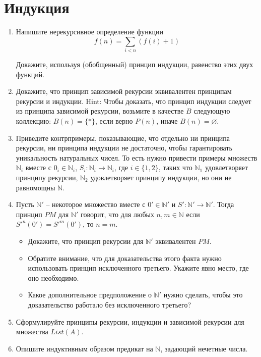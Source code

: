 \section*{Индукция}
\begin{enumerate}

\item Напишите нерекурсивное определение функции
\[ f(n) = \sum_{i < n} (f(i) + 1) \]

Докажите, используя (обобщенный) принцип индукции, равенство этих двух функций.


\item Докажите, что принцип зависимой рекурсии эквивалентен принципам рекурсии и индукции.
    Hint: Чтобы доказать, что принцип индукции следует из принципа зависимой рекурсии, возьмите в качестве $B$ следующую коллекцию:
    $B(n) = \{ * \}$, если верно $P(n)$, иначе $B(n) = \varnothing$.

\item Приведите контрпримеры, показывающие, что отдельно ни принципа рекурсии, ни принципа индукции не достаточно, чтобы гарантировать уникальность натуральных чисел.
    То есть нужно привести примеры множеств $\mathbb{N}_i$ вместе с $0_i \in \mathbb{N}_i$, $S_i : \mathbb{N}_i \to \mathbb{N}_i$, где $i \in \{ 1, 2 \}$,
    таких что $\mathbb{N}_1$ удовлетворяет принципу рекурсии, $\mathbb{N}_2$ удовлетворяет принципу индукции, но они не равномощны $\mathbb{N}$.

\item Пусть $\mathbb{N}'$ -- некоторое множество вместе с $0' \in \mathbb{N}'$ и $S' : \mathbb{N}' \to \mathbb{N}'$.
    Тогда принцип $PM$ для $\mathbb{N}'$ говорит, что для любых $n,m \in \mathbb{N}$ если $S'^n(0') = S'^m(0')$, то $n = m$.
\begin{itemize}
\item Докажите, что принцип рекурсии для $\mathbb{N}'$ эквивалентен $PM$.
\item Обратите внимание, что для доказательства этого факта нужно использовать принцип исключенного третьего. Укажите явно место, где оно необходимо.
\item Какое дополнительное предположение о $\mathbb{N}'$ нужно сделать, чтобы это доказательство работало без исключенного третьего?
\end{itemize}

\item Сформулируйте принципы рекурсии, индукции и зависимой рекурсии для множества $List(A)$.

\item Опишите индуктивным образом предикат на $\mathbb{N}$, задающий нечетные числа.

\end{enumerate}

